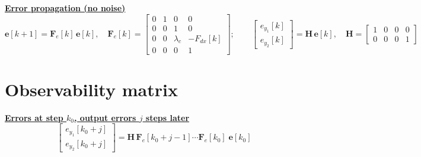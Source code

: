 \documentclass[11pt,a4paper]{ctexart}
\newcommand{\lc}{\lambda_c}
\newcommand{\hd}[1]{\par\bigskip\noindent\underline{\textbf{#1}}}
\begin{document}
\hd{Error propagation (no noise)}
\[
\mathbf{e}[k+1] = \mathbf{F}_e[k]\,\mathbf{e}[k], \quad
\mathbf{F}_e[k] =
\begin{bmatrix}
0 & 1 & 0 & 0 \\
0 & 0 & 1 & 0 \\
0 & 0 & \lc & -F_{dx}[k] \\
0 & 0 & 0 & 1
\end{bmatrix};
\qquad
\begin{bmatrix} e_{y_1}[k] \\ e_{y_2}[k] \end{bmatrix} = \mathbf{H}\,\mathbf{e}[k], \quad
\mathbf{H} =
\begin{bmatrix}
1 & 0 & 0 & 0 \\
0 & 0 & 0 & 1
\end{bmatrix}
\]

\section{Observability matrix}

\hd{Errors at step $k_0$, output errors $j$ steps later}
\[
\begin{bmatrix} e_{y_1}[k_0+j] \\ e_{y_2}[k_0+j] \end{bmatrix}
= \mathbf{H}\,\mathbf{F}_e[k_0+j-1]\cdots\mathbf{F}_e[k_0]\;\mathbf{e}[k_0]
\]
\end{document}

